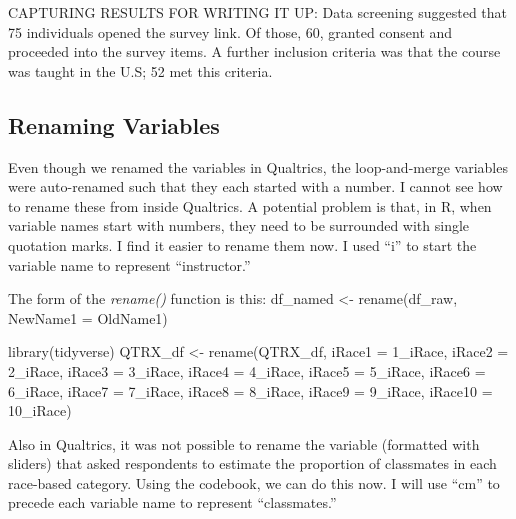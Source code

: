 \documentclass[
  11pt,
]{book}
\newenvironment{Shaded}{\begin{snugshade}}{\end{snugshade}}
\newcommand{\AttributeTok}[1]{\textcolor[rgb]{0.77,0.63,0.00}{#1}}
\newcommand{\FunctionTok}[1]{\textcolor[rgb]{0.00,0.00,0.00}{#1}}
\newcommand{\NormalTok}[1]{#1}
\newcommand{\OtherTok}[1]{\textcolor[rgb]{0.56,0.35,0.01}{#1}}
\newcommand{\StringTok}[1]{\textcolor[rgb]{0.31,0.60,0.02}{#1}}
\begin{document}
CAPTURING RESULTS FOR WRITING IT UP: Data screening suggested that 75 individuals opened the survey link. Of those, 60, granted consent and proceeded into the survey items. A further inclusion criteria was that the course was taught in the U.S; 52 met this criteria.

\hypertarget{renaming-variables}{%
\subsection{Renaming Variables}\label{renaming-variables}}

Even though we renamed the variables in Qualtrics, the loop-and-merge variables were auto-renamed such that they each started with a number. I cannot see how to rename these from inside Qualtrics. A potential problem is that, in R, when variable names start with numbers, they need to be surrounded with single quotation marks. I find it easier to rename them now. I used ``i'' to start the variable name to represent ``instructor.''

The form of the \emph{rename()} function is this:
df\_named \textless- rename(df\_raw, NewName1 = OldName1)

\begin{Shaded}
\begin{Highlighting}[]
\FunctionTok{library}\NormalTok{(tidyverse)}
\NormalTok{QTRX\_df }\OtherTok{\textless{}{-}} \FunctionTok{rename}\NormalTok{(QTRX\_df, }\AttributeTok{iRace1 =} \StringTok{\textquotesingle{}1\_iRace\textquotesingle{}}\NormalTok{, }\AttributeTok{iRace2 =} \StringTok{\textquotesingle{}2\_iRace\textquotesingle{}}\NormalTok{, }\AttributeTok{iRace3 =} \StringTok{\textquotesingle{}3\_iRace\textquotesingle{}}\NormalTok{, }\AttributeTok{iRace4 =} \StringTok{\textquotesingle{}4\_iRace\textquotesingle{}}\NormalTok{, }\AttributeTok{iRace5 =} \StringTok{\textquotesingle{}5\_iRace\textquotesingle{}}\NormalTok{, }\AttributeTok{iRace6 =} \StringTok{\textquotesingle{}6\_iRace\textquotesingle{}}\NormalTok{, }\AttributeTok{iRace7 =} \StringTok{\textquotesingle{}7\_iRace\textquotesingle{}}\NormalTok{, }\AttributeTok{iRace8 =} \StringTok{\textquotesingle{}8\_iRace\textquotesingle{}}\NormalTok{, }\AttributeTok{iRace9 =} \StringTok{\textquotesingle{}9\_iRace\textquotesingle{}}\NormalTok{, }\AttributeTok{iRace10 =} \StringTok{\textquotesingle{}10\_iRace\textquotesingle{}}\NormalTok{)}
\end{Highlighting}
\end{Shaded}

Also in Qualtrics, it was not possible to rename the variable (formatted with sliders) that asked respondents to estimate the proportion of classmates in each race-based category. Using the codebook, we can do this now. I will use ``cm'' to precede each variable name to represent ``classmates.''
\end{document}
